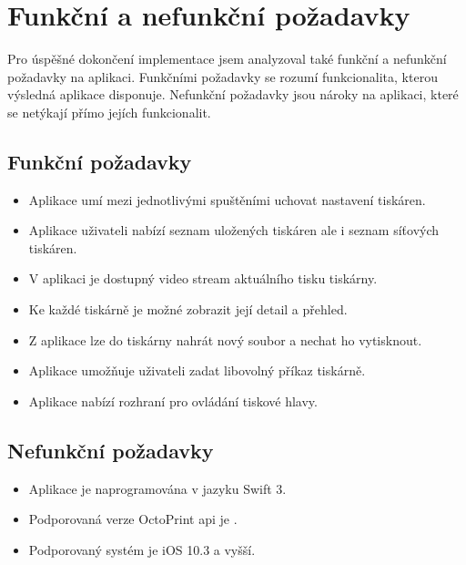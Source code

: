 \section{Funkční a nefunkční požadavky}

Pro úspěšné dokončení implementace jsem analyzoval také funkční a nefunkční požadavky na aplikaci.
Funkčními požadavky se rozumí funkcionalita, kterou výsledná aplikace disponuje.
Nefunkční požadavky jsou nároky na aplikaci, které se netýkají přímo jejích funkcionalit.

\subsection{Funkční požadavky}

\begin{itemize}
    \item Aplikace umí mezi jednotlivými spuštěními uchovat nastavení tiskáren.
    \item Aplikace uživateli nabízí seznam uložených tiskáren ale i seznam síťových tiskáren.
    \item V aplikaci je dostupný video stream aktuálního tisku tiskárny.
    \item Ke každé tiskárně je možné zobrazit její detail a přehled.
    \item Z aplikace lze do tiskárny nahrát nový soubor a nechat ho vytisknout.
    \item Aplikace umožňuje uživateli zadat libovolný příkaz tiskárně.
    \item Aplikace nabízí rozhraní pro ovládání tiskové hlavy.
\end{itemize}

\subsection{Nefunkční požadavky}

\begin{itemize}
    \item Aplikace je naprogramována v jazyku Swift 3.
    \item Podporovaná verze OctoPrint \acrshort{api} je \vapi{}.
    \item Podporovaný systém je iOS 10.3 a vyšší.
\end{itemize}